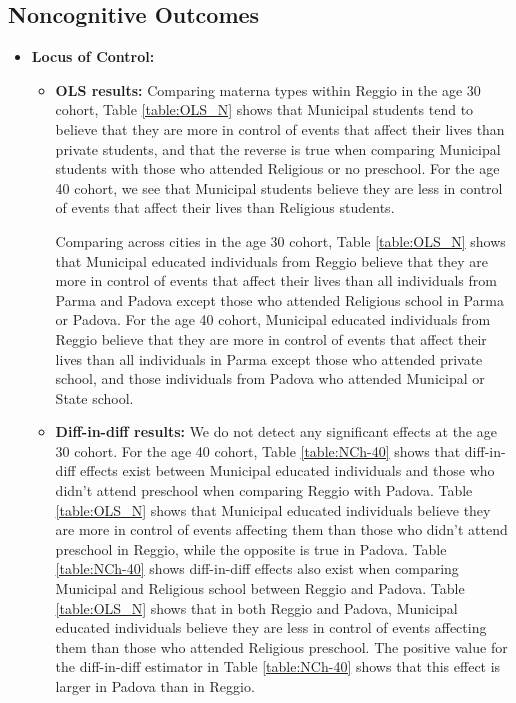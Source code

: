\documentclass[11pt]{article}
\begin{document}
\subsection{Noncognitive Outcomes}

\begin{itemize}
\item \textbf{Locus of Control:} 
	
	\begin{itemize}
	\item \textbf{OLS results:} Comparing materna types within Reggio in the age 30 cohort, Table \ref{table:OLS_N} shows that Municipal students tend to believe that they are more in control of events that affect their lives than private students, and that the reverse is true when comparing Municipal students with those who attended Religious or no preschool. For the age 40 cohort, we see that Municipal students believe they are less in control of events that affect their lives than Religious students.

	Comparing across cities in the age 30 cohort, Table \ref{table:OLS_N} shows that Municipal educated individuals from Reggio believe that they are more in control of events that affect their lives than all individuals from Parma and Padova except those who attended Religious school in Parma or Padova. For the age 40 cohort, Municipal educated individuals from Reggio believe that they are more in control of events that affect their lives than all individuals in Parma except those who attended private school, and those individuals from Padova who attended Municipal or State school.

	\item \textbf{Diff-in-diff results:} We do not detect any significant effects at the age 30 cohort. For the age 40 cohort, Table \ref{table:NCh-40} shows that diff-in-diff effects exist between Municipal educated individuals and those who didn't attend preschool when comparing Reggio with Padova. Table \ref{table:OLS_N} shows that Municipal educated individuals believe they are more in control of events affecting them than those who didn't attend preschool in Reggio, while the opposite is true in Padova. Table \ref{table:NCh-40} shows diff-in-diff effects also exist when comparing Municipal and Religious school between Reggio and Padova.  Table \ref{table:OLS_N} shows that in both Reggio and Padova, Municipal educated individuals believe they are less in control of events affecting them than those who attended Religious preschool. The positive value for the diff-in-diff estimator in Table \ref{table:NCh-40} shows that this effect is larger in Padova than in Reggio.
	\end{itemize}


\end{itemize}
\end{document}
